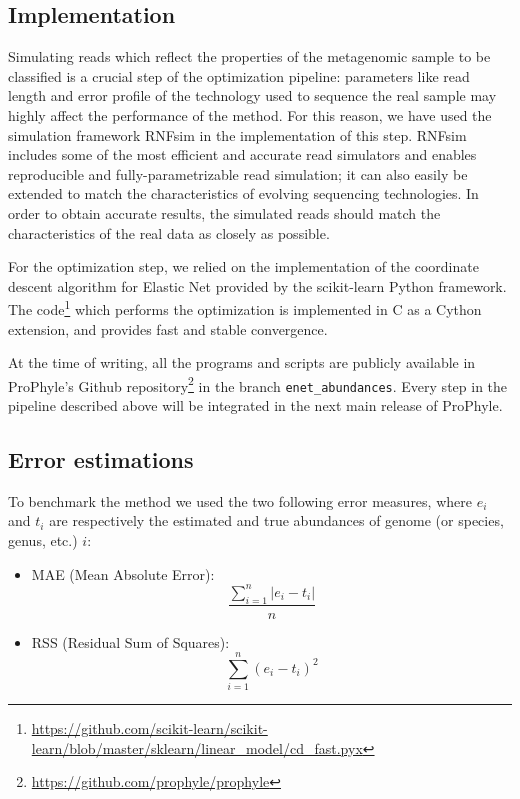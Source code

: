 \subsection{Implementation}

Simulating reads which reflect the properties of the metagenomic sample to be classified is a crucial step of the optimization pipeline: parameters like read length and error profile of the technology used to sequence the real sample may highly affect the performance of the method. For this reason, we have used the simulation framework RNFsim \cite{brinda_rnf_2016} in the implementation of this step. RNFsim includes some of the most efficient and accurate read simulators and enables reproducible and fully-parametrizable read simulation; it can also easily be extended to match the characteristics of evolving sequencing technologies. In order to obtain accurate results, the simulated reads should match the characteristics of the real data as closely as possible.

For the optimization step, we relied on the implementation of the coordinate descent algorithm for Elastic Net provided by the scikit-learn Python framework. The code\footnote{\url{https://github.com/scikit-learn/scikit-learn/blob/master/sklearn/linear_model/cd_fast.pyx}} which performs the optimization is implemented in C as a Cython extension, and provides fast and stable convergence.

At the time of writing, all the programs and scripts are publicly available in ProPhyle's Github repository\footnote{\url{https://github.com/prophyle/prophyle}} in the branch \texttt{enet\_abundances}. Every step in the pipeline described above will be integrated in the next main release of ProPhyle.

\subsection{Error estimations}

To benchmark the method we used the two following error measures, where $e_i$ and $t_i$ are respectively the estimated and true abundances of genome (or species, genus, etc.) $i$:
\begin{itemize}
  \item MAE (Mean Absolute Error):
  \begin{equation*}
    \frac{\sum_{i=1}^n |e_i - t_i|}{n}
  \end{equation*}
  \item RSS (Residual Sum of Squares):
  \begin{equation*}
    \sum_{i=1}^n (e_i - t_i)^2
  \end{equation*}
\end{itemize}

